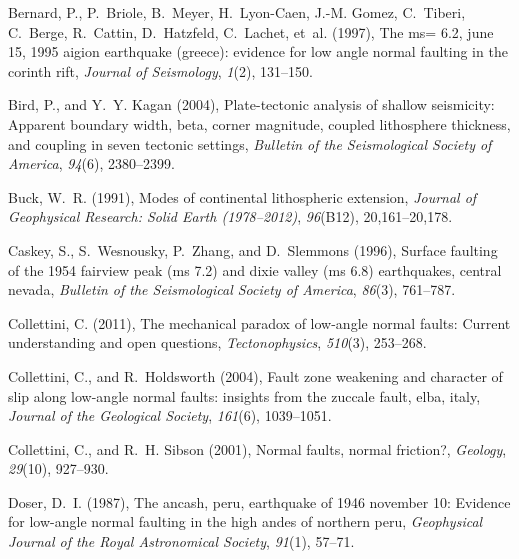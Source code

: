 \documentclass[twocolumn,grl]{AGUTeX}
\begin{document}
\begin{article}
\begin{thebibliography}{25}
Bernard, P., P.~Briole, B.~Meyer, H.~Lyon-Caen, J.-M. Gomez, C.~Tiberi,
  C.~Berge, R.~Cattin, D.~Hatzfeld, C.~Lachet, et~al. (1997), The ms= 6.2, june
  15, 1995 aigion earthquake (greece): evidence for low angle normal faulting
  in the corinth rift, \textit{Journal of Seismology}, \textit{1}(2), 131--150.

Bird, P., and Y.~Y. Kagan (2004), Plate-tectonic analysis of shallow
  seismicity: Apparent boundary width, beta, corner magnitude, coupled
  lithosphere thickness, and coupling in seven tectonic settings,
  \textit{Bulletin of the Seismological Society of America}, \textit{94}(6),
  2380--2399.

Buck, W.~R. (1991), Modes of continental lithospheric extension,
  \textit{Journal of Geophysical Research: Solid Earth (1978--2012)},
  \textit{96}(B12), 20,161--20,178.

Caskey, S., S.~Wesnousky, P.~Zhang, and D.~Slemmons (1996), Surface faulting of
  the 1954 fairview peak (ms 7.2) and dixie valley (ms 6.8) earthquakes,
  central nevada, \textit{Bulletin of the Seismological Society of America},
  \textit{86}(3), 761--787.

Collettini, C. (2011), The mechanical paradox of low-angle normal faults:
  Current understanding and open questions, \textit{Tectonophysics},
  \textit{510}(3), 253--268.

Collettini, C., and R.~Holdsworth (2004), Fault zone weakening and character of
  slip along low-angle normal faults: insights from the zuccale fault, elba,
  italy, \textit{Journal of the Geological Society}, \textit{161}(6),
  1039--1051.

Collettini, C., and R.~H. Sibson (2001), Normal faults, normal friction?,
  \textit{Geology}, \textit{29}(10), 927--930.

Doser, D.~I. (1987), The ancash, peru, earthquake of 1946 november 10: Evidence
  for low-angle normal faulting in the high andes of northern peru,
  \textit{Geophysical Journal of the Royal Astronomical Society},
  \textit{91}(1), 57--71.


\end{thebibliography}
\end{article}
\end{document}
